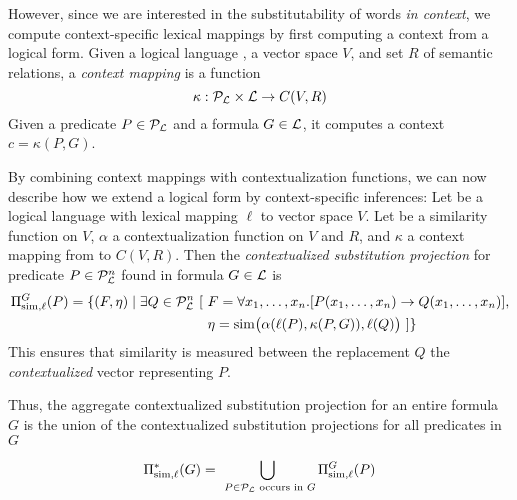 However, since we are interested in the substitutability of words {\it in
context}, we compute context-specific lexical mappings by first computing a
context from a logical form. Given a logical language \loglang, a vector space
$V$, and set $R$ of semantic relations, a \textit{context mapping} is a function
\[ \kappa: {\cal{P}}_{{\cal{L}}} \times {\cal{L}} \to C(V, R) \] Given a predicate
$P \in {\cal{P}}_{{\cal{L}}}$ and a formula $G \in {\cal{L}}$, it computes a context
$c = \kappa(P, G)$.

By combining context mappings with contextualization functions, we can now
describe how we extend a logical form by context-specific inferences: Let
\loglang be a logical language with lexical mapping $\ell$ to vector space $V$.
Let \simfunc{} be a similarity function on $V$, $\alpha$ a contextualization function
on $V$ and $R$, and $\kappa$ a context mapping from \loglang to $C(V, R)$.
Then the \textit{contextualized substitution projection} for predicate $P \in
{\cal{P}}_{{\cal{L}}}^n$ found in formula $G \in {\cal{L}}$ is
\begin{align*}
\Pi^G_{\mathrm{sim}, \ell}(P) = \{ (F, \eta) \mid \exists Q \in {\cal{P}}_{{\cal{L}}}^n~[ 
&~F = \forall x_1, \ldots, x_n.[P(x_1, \ldots, x_n) \to Q(x_1, \ldots, x_n)], \\
&~\eta = \mathrm{sim}\big(\alpha(\ell(P), \kappa(P, G)), \ell(Q)\big) ~] \}
\end{align*}
This ensures that similarity is measured between the replacement $Q$ the {\em contextualized}
vector representing $P$.

Thus, the aggregate contextualized substitution projection for an entire formula
$G$ is the union of the contextualized substitution projections for all
predicates in $G$

\[\Pi^*_{\mathrm{sim}, \ell}(G) = \bigcup_{~P \in {\cal{P}}_{{\cal{L}}} \text{ occurs in }
G} \Pi^G_{\mathrm{sim}, \ell}(P) \] 


